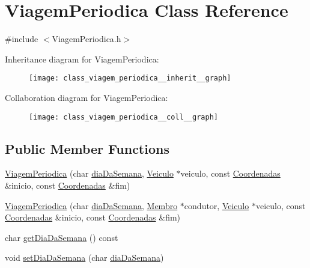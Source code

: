 \hypertarget{class_viagem_periodica}{\section{Viagem\+Periodica Class Reference}
\label{class_viagem_periodica}
}


{\ttfamily \#include $<$Viagem\+Periodica.\+h$>$}



Inheritance diagram for Viagem\+Periodica\+:\nopagebreak
\begin{figure}[H]
\begin{center}
\leavevmode
\texttt{[image: class\_viagem\_periodica\_\_inherit\_\_graph]}
\end{center}
\end{figure}


Collaboration diagram for Viagem\+Periodica\+:\nopagebreak
\begin{figure}[H]
\begin{center}
\leavevmode
\texttt{[image: class\_viagem\_periodica\_\_coll\_\_graph]}
\end{center}
\end{figure}
\subsection*{Public Member Functions}
\begin{DoxyCompactItemize}
\item 
\hyperlink{class_viagem_periodica_aac7574ed67f67dad6d16751c2d024670}{Viagem\+Periodica} (char \hyperlink{class_viagem_periodica_ac53255ef9f3e6d862e2ac803d7e45206}{dia\+Da\+Semana}, \hyperlink{class_veiculo}{Veiculo} $\ast$veiculo, const \hyperlink{class_coordenadas}{Coordenadas} \&inicio, const \hyperlink{class_coordenadas}{Coordenadas} \&fim)
\item 
\hyperlink{class_viagem_periodica_a13fc61d10fe1d8f3ced8e7f9557c2553}{Viagem\+Periodica} (char \hyperlink{class_viagem_periodica_ac53255ef9f3e6d862e2ac803d7e45206}{dia\+Da\+Semana}, \hyperlink{class_membro}{Membro} $\ast$condutor, \hyperlink{class_veiculo}{Veiculo} $\ast$veiculo, const \hyperlink{class_coordenadas}{Coordenadas} \&inicio, const \hyperlink{class_coordenadas}{Coordenadas} \&fim)
\item 
char \hyperlink{class_viagem_periodica_a18ccdd2f58dd4fbf3dc95e1927a61af7}{get\+Dia\+Da\+Semana} () const 
\item 
void \hyperlink{class_viagem_periodica_a1351abcca608d827c5c4eb7ba2f45e14}{set\+Dia\+Da\+Semana} (char \hyperlink{class_viagem_periodica_ac53255ef9f3e6d862e2ac803d7e45206}{dia\+Da\+Semana})
\end{DoxyCompactItemize}
